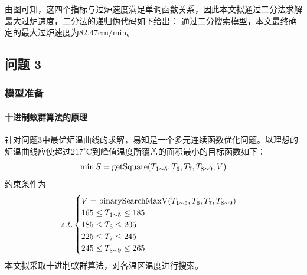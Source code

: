 \documentclass[../main.tex]{subfiles}
\begin{document}
由图可知，这四个指标与过炉速度满足单调函数关系，因此本文拟通过二分法求解最大过炉速度，二分法的递归伪代码如下给出：
% 
% 
% 
% 
% 
通过二分搜索模型，本文最终确定的最大过炉速度为\(82.47 \mathrm{cm}/\mathrm{min}\)。

\subsection{问题 3}
\subsubsection{模型准备}
\paragraph{十进制蚁群算法的原理}
针对问题3中最优炉温曲线的求解，易知是一个多元连续函数优化问题。以理想的炉温曲线应使超过\(217 ^{\circ}\mathrm{C}\)到峰值温度所覆盖的面积最小的目标函数如下：
\begin{equation}
\min S = \mathrm{getSquare} (T _{1 {\sim} 5},T _{6} , T _{7} , T _{8 {\sim} 9}, V) \\
\end{equation}
约束条件为
\begin{equation}{\it s.t.}
\begin{cases}
V = \mathrm{binarySearchMaxV} (T _{1{\sim} 5}, T_{6} , T _{7},T_{8{\sim} 9})\\
165 \le T_{1 {\sim} 5} \le 185\\
185 \le T _{6} \le 205 \\
225 \le T _{7} \le 245 \\
245 \le T _{8 {\sim} 9} \le 265
\end{cases}
\end{equation}
本文拟采取十进制蚁群算法，对各温区温度进行搜索。
\end{document}
